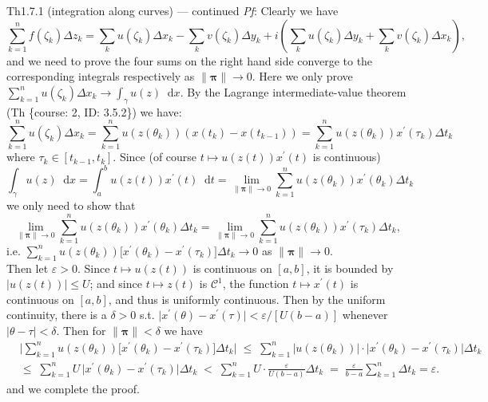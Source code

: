 \documentclass{article}
\newcommand{\dif}{\mathop{}\!\mathrm{d}}
\begin{document}
\begin{Th}{Th1.7.1 (integration along curves) — continued}
    \textit{Pf}: Clearly we have
    $$ \sum_{k=1}^{n} f(\zeta_k)\Delta z_k = \sum_k u(\zeta_k)\Delta x_k - \sum_k v(\zeta_k)\Delta y_k + i \left(\sum_k u(\zeta_k)\Delta y_k + \sum_k v(\zeta_k)\Delta x_k\right), $$
    and we need to prove the four sums on the right hand side converge to the corresponding integrals respectively as $\|\pmb{\pi}\|\to 0$. Here we only prove $\sum_{k=1}^{n} u(\zeta_k)\Delta x_k \to \int_\gamma u(z)\dif x$. By the Lagrange intermediate-value theorem (Th \{course: 2, ID: 3.5.2\}) we have:
    $$ \sum_{k=1}^{n} u(\zeta_k)\Delta x_k = \sum_{k=1}^{n} u(z(\theta_k))\left(x(t_k)-x(t_{k-1})\right) = \sum_{k=1}^{n} u(z(\theta_k)) x^\prime (\tau_k) \Delta t_k $$
    where $\tau_k\in [t_{k-1}, t_k]$. Since (of course $t\mapsto u(z(t)) x^\prime (t)$ is continuous)
    $$ \int_\gamma u(z)\dif x = \int_a^b u(z(t)) x^\prime (t) \dif t  = \lim\limits_{\|\pmb{\pi}\|\to 0} \sum_{k=1}^{n} u(z(\theta_k)) x^\prime (\theta_k) \Delta t_k $$
    we only need to show that
    $$ \lim\limits_{\|\pmb{\pi}\|\to 0} \sum_{k=1}^{n} u(z(\theta_k)) x^\prime (\theta_k) \Delta t_k = \lim\limits_{\|\pmb{\pi}\|\to 0} \sum_{k=1}^{n} u(z(\theta_k)) x^\prime (\tau_k) \Delta t_k, $$
    i.e. $\sum_{k=1}^{n} u(z(\theta_k)) \Big[x^\prime (\theta_k) - x^\prime (\tau_k)\Big] \Delta t_k \rightarrow 0$ as $\|\pmb{\pi}\|\to 0$. \\
    Then let $\varepsilon > 0$. Since $t\mapsto u(z(t))$ is continuous on $[a,b]$, it is bounded by $\big|u(z(t))\big|\leq U$; and since $t\mapsto z(t)$ is $\mathcal{C}^1$, the function $t\mapsto x^\prime (t)$ is continuous on $[a,b]$, and thus is uniformly continuous. Then by the uniform continuity, there is a $\delta>0$ s.t. $\Big|x^\prime (\theta) - x^\prime (\tau)\Big| < \varepsilon/[U(b-a)]$ whenever $|\theta-\tau|<\delta$. Then for $\|\pmb{\pi}\|<\delta$ we have
    $$ 
    \begin{aligned}
        & \Bigg| \sum_{k=1}^{n} u(z(\theta_k)) \Big[x^\prime (\theta_k) - x^\prime (\tau_k)\Big] \Delta t_k \Bigg| \;\leq\; \sum_{k=1}^{n} \big|u(z(\theta_k))\big| \cdot \Big|x^\prime (\theta_k) - x^\prime (\tau_k)\Big| \Delta t_k \\
        & \leq\; \sum_{k=1}^{n} U\, \Big|x^\prime (\theta_k) - x^\prime (\tau_k)\Big| \Delta t_k \;<\; \sum_{k=1}^{n} U \cdot \frac{\varepsilon}{U(b-a)} \Delta t_k \; = \; \frac{\varepsilon}{b-a} \sum_{k=1}^{n} \Delta t_k = \varepsilon.
    \end{aligned}
    $$
    and we complete the proof.
\end{Th}
\end{document}
